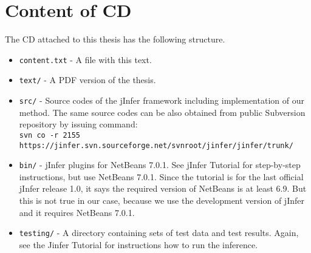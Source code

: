 \chapter{Content of CD}
The CD attached to this thesis has the following structure.

\begin{itemize}
\item \texttt{content.txt} - A file with this text.
\item \texttt{text/} - A PDF version of the thesis.
\item \texttt{src/} - Source codes of the jInfer framework including implementation of our method. The same source codes can be also obtained from public Subversion repository by issuing command:\\
\texttt{svn co -r 2155 \\ https://jinfer.svn.sourceforge.net/svnroot/jinfer/jinfer/trunk/}
\item \texttt{bin/} - jInfer plugins for NetBeans 7.0.1. See jInfer Tutorial \cite{jinfer_tutorial} for step-by-step instructions, but use NetBeans 7.0.1. Since the tutorial is for the last official jInfer release 1.0, it says the required version of NetBeans is at least 6.9. But this is not true in our case, because we use the development version of jInfer and it requires NetBeans 7.0.1.
\item \texttt{testing/} - A directory containing sets of test data and test results. Again, see the Jinfer Tutorial \cite{jinfer_tutorial} for instructions how to run the inference. 
\end{itemize}